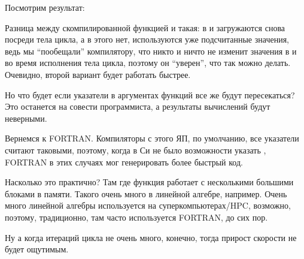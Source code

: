 Посмотрим результат:



Разница между скомпилированной функцией  и  такая: 
в   и  загружаются снова посреди тела цикла,
а в  этого нет, используются уже подсчитанные значения, ведь мы ``пообещали'' компилятору, 
что никто и ничто не изменит
значения в  и  во время исполнения тела цикла, поэтому он ``уверен'', что так можно делать. 
Очевидно, второй вариант будет работать быстрее.

Но что будет если указатели в аргументах функций все же будут пересекаться? Это останется на совести программиста, 
а результаты вычислений будут неверными.

Вернемся к FORTRAN. Компиляторы с этого ЯП, по умолчанию, все указатели считают таковыми, поэтому, когда в Си не было
возможности указать , FORTRAN в этих случаях мог генерировать более быстрый код.

Насколько это практично? Там где функция работает с несколькими большими блоками в памяти. 
Такого очень много в линейной алгебре, например. Очень много линейной алгебры используется на суперкомпьютерах/HPC,
возможно, поэтому, традиционно, там часто используется FORTRAN, до сих пор\cite{Loh:2010:IHP:1810226.1820518}.

Ну а когда итераций цикла не очень много, конечно, тогда прирост скорости не будет ощутимым.

